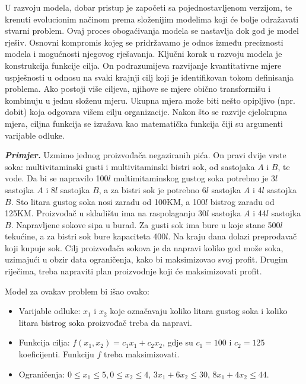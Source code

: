 \documentclass[a4paper, utf8, 11pt, colorlinks]{book}
\begin{document}
 U razvoju modela, dobar pristup je započeti sa pojednostavljenom verzijom, te   krenuti evolucionim načinom prema složenijim modelima koji će bolje odražavati  stvarni problem. Ovaj proces obogaćivanja modela se nastavlja dok god je model rješiv. Osnovni kompromis kojeg se pridržavamo je odnos između preciznosti modela i mogućnosti njegovog rješavanja. Ključni korak u razvoju modela je konstrukcija funkcije cilja.
On podrazumijeva razvijanje kvantitativne mjere uspješnosti u odnosu na svaki   krajnji cilj koji je identifikovan tokom definisanja problema.
Ako postoji više ciljeva, njihove se mjere obično transformišu
i kombinuju u jednu složenu mjeru.  Ukupna mjera može biti nešto opipljivo (npr. dobit) koja odgovara višem cilju
organizacije.  Nakon što se razvije cjelokupna mjera,  ciljna funkcija se izražava kao matematička funkcija čiji su argumenti varijable odluke. 

\textbf{\emph{Primjer.}}  Uzmimo jednog proizvođa\v ca negaziranih pi\'ca. On pravi dvije vrste soka: multivitaminski gusti i multivitaminski bistri sok, od sastojaka $A$ i $B$, te vode. Da bi se napravilo 100$l$ multimitaminskog gustog soka potrebno je 3$l$
sastojka $A$ i 8$l$ sastojka $B$, a za bistri sok je potrebno 6$l$ sastojka $A$ i 4$l$ sastojka $B$. Sto litara gustog soka nosi zaradu od 100KM, a 100$l$ bistrog zaradu od 125KM. Proizvođa\v c u skladi\v stu
ima na raspolaganju 30$l$ sastojka $A$ i 44$l$ sastojka $B.$ Napravljene sokove sipa u burad. Za
gusti sok ima bure u koje stane 500$l$ teku\' cine, a za bistri sok bure kapaciteta 400$l$. Na kraju dana dolazi preprodava\v c koji kupuje sok. Cilj proizvođa\v ca sokova je da napravi koliko god
mo\v ze soka, uzimaju\' ci u obzir data ograni\v cenja, kako bi maksimizovao svoj profit. Drugim
rije\v cima, treba napraviti plan proizvodnje koji \' ce maksimizovati profit.

Model za ovakav problem bi išao ovako:
\begin{itemize}
    \item 
Varijable odluke: $x_1$ i $x_2$ koje označavaju koliko litara gustog soka i koliko litara bistrog soka proizvođač treba da napravi.  
\item Funkcija cilja: $f(x_1, x_2) = c_1x_1 + c_2 x_2$, gdje su $c_1 = 100$ i  $c_2 = 125$ koeficijenti. Funkciju $f$ treba maksimizovati. \\
\item Ograničenja: $0 \leq x_1 \leq 5, 0 \leq x_2 \leq 4$,   $3 x_1 + 6 x_2 \leq 30$, $8 x_1 + 4 x_2 \leq 44.$
\end{itemize}
\end{document}

